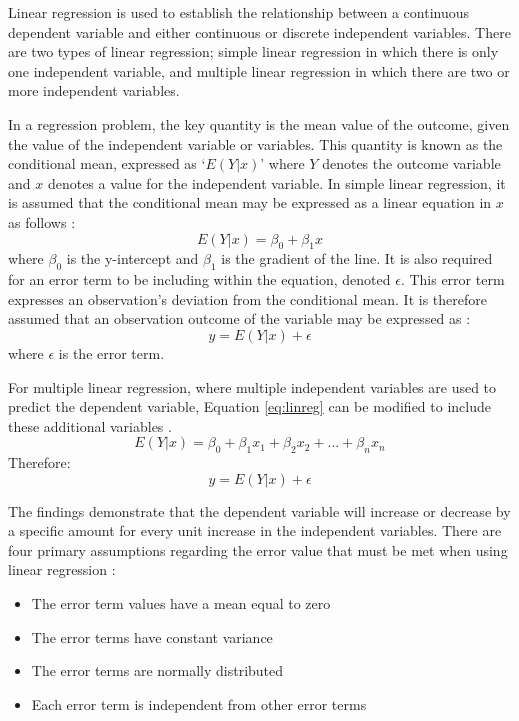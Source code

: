 \documentclass[../thesis.tex]{subfiles}
\begin{document}
Linear regression is used to establish the relationship between a continuous dependent variable and either continuous or discrete independent variables. There are two types of linear regression; simple linear regression in which there is only one independent variable, and multiple linear regression in which there are two or more independent variables.

In a regression problem, the key quantity is the mean value of the outcome, given the value of the independent variable or variables. This quantity is known as the conditional mean, expressed as `$E(Y | x)$' where $Y$ denotes the outcome variable and $x$ denotes a value for the independent variable. In simple linear regression, it is assumed that the conditional mean may be expressed as a linear equation in $x$ as follows \cite{Hosmer1989,Wasserman2004}:
\begin{equation}\label{eq:linreg}
    E(Y | x) = \beta_{0} +\beta_{1}x
\end{equation}
where $\beta_{0}$ is the y-intercept and $\beta_{1}$ is the gradient of the line. 
It is also required for an error term to be including within the equation, denoted $\epsilon$. This error term expresses an observation's deviation from the conditional mean. It is therefore assumed that an observation outcome of the variable may be expressed as \textcolor{blue}{\cite{Hosmer1989, Wasserman2004}}:
\begin{equation}
    y = E(Y | x) + \epsilon
\end{equation}
where $\epsilon$ is the error term.

For multiple linear regression, where multiple independent variables are used to predict the dependent variable, Equation \eqref{eq:linreg} can be modified to include these additional variables \textcolor{blue}{\cite{Hosmer1989}}.
\begin{equation}
    E(Y | x) = \beta_{0} +\beta_{1}x_{1} +\beta_{2}x_{2} + ... +\beta_{n}x_{n}
\end{equation}
Therefore:
\begin{equation}
    y = E(Y | x) + \epsilon
\end{equation}

The findings demonstrate that the dependent variable will increase or decrease by a specific amount for every unit increase in the independent variables. There are four primary assumptions regarding the error value that must be met when using linear regression \textcolor{blue}{\cite{Bowerman2015}}:
\begin{itemize}
    \item The error term values have a mean equal to zero
    \item The error terms have constant variance
    \item The error terms are normally distributed
    \item Each error term is independent from other error terms
\end{itemize}
\end{document}

